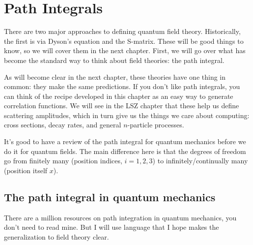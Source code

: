 \documentclass[main.tex]{subfiles}
\begin{document}
\chapter{Path Integrals}
There are two major approaches to defining quantum field theory. Historically, the first is via Dyson's equation and the S-matrix. These will be good things to know, so we will cover them in the next chapter. First, we will go over what has become the standard way to think about field theories: the path integral.

As will become clear in the next chapter, these theories have one thing in common: they make the same predictions. If you don't like path integrals, you can think of the recipe developed in this chapter as an easy way to generate correlation functions. We will see in the LSZ chapter that these help us define scattering amplitudes, which in turn give us the things we care about computing: cross sections, decay rates, and general $n$-particle processes.

It's good to have a review of the path integral for quantum mechanics before we do it for quantum fields. The main difference here is that the degrees of freedom go from finitely many (position indices, $i=1,2,3$) to infinitely/continually many (position itself $x$).
\section{The path integral in quantum mechanics}
There are a million resources on path integration in quantum mechanics, you don't need to read mine. But I will use language that I hope makes the generalization to field theory clear.
\end{document}
